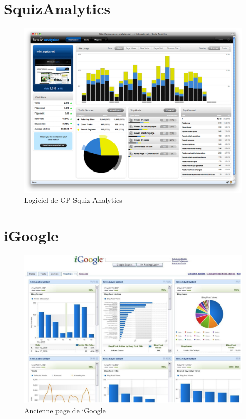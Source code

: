 \documentclass[12pt]{report}
\begin{document}
\renewcommand{\appendixtocname}{Annexes} 
\begin{appendices}
\titlespacing*{\chapter}{0pt}{-0.8in}{20pt}

	\chapter{SquizAnalytics}

	\begin{figure}[!h]
	\centering
	\includegraphics[width=1\textwidth]{pictures/squiz.png}
	\caption{Logiciel de GP Squiz Analytics}
	\label{a1}
\end{figure}
	
	\chapter{iGoogle}
	
	\begin{figure}[!h]
	\centering
	\includegraphics[width=1\textwidth]{pictures/igoogle.png}
	\caption{Ancienne page de iGoogle}
	\label{a2}
\end{figure}
	

\end{appendices}
\end{document}
